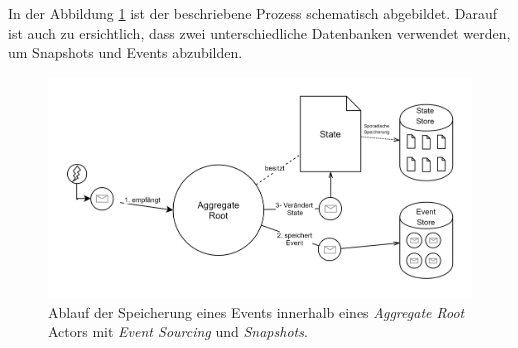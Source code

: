In der Abbildung \ref{fig:implementation:eventSourcingAggregateRoot} ist der beschriebene Prozess schematisch abgebildet. Darauf ist auch zu ersichtlich, dass zwei unterschiedliche Datenbanken verwendet werden, um Snapshots und Events abzubilden.
\begin{figure}
  \centering
  \includegraphics[width=\linewidth]{gfx/implementation/EventSourcingAkka}
  \caption{Ablauf der Speicherung eines Events innerhalb eines \textit{Aggregate Root} Actors mit \textit{Event Sourcing} und \textit{Snapshots}.}
  \label{fig:implementation:eventSourcingAggregateRoot}
\end{figure} 

